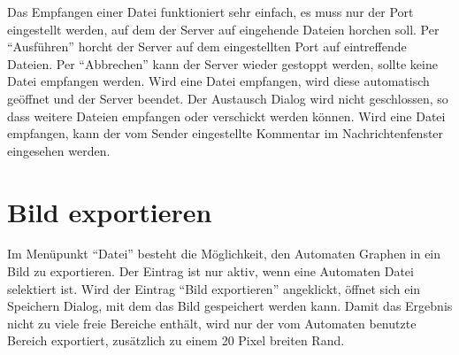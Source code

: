 Das Empfangen einer Datei funktioniert sehr einfach, es muss nur der Port
eingestellt werden, auf dem der Server auf eingehende Dateien horchen soll. Per
"`Ausführen"' horcht der Server auf dem eingestellten Port auf eintreffende
Dateien. Per "`Abbrechen"' kann der Server wieder gestoppt werden, sollte keine
Datei empfangen werden. Wird eine Datei empfangen, wird diese automatisch
geöffnet und der Server beendet. Der Austausch Dialog wird nicht geschlossen, so
dass weitere Dateien empfangen oder verschickt werden können. Wird eine Datei
empfangen, kann der vom Sender eingestellte Kommentar im Nachrichtenfenster
eingesehen werden.


\section{Bild exportieren}

Im Menüpunkt "`Datei"' besteht die Möglichkeit, den Automaten Graphen in ein
Bild zu exportieren. Der Eintrag ist nur aktiv, wenn eine Automaten Datei
selektiert ist. Wird der Eintrag "`Bild exportieren"' angeklickt, öffnet sich
ein Speichern Dialog, mit dem das Bild gespeichert werden kann. Damit das
Ergebnis nicht zu viele freie Bereiche enthält, wird nur der vom Automaten
benutzte Bereich exportiert, zusätzlich zu einem 20 Pixel breiten Rand.